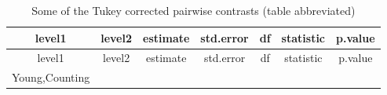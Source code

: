 \documentclass[]{article}
\begin{document}
\begin{longtable}[]{@{}ccccccc@{}}
\caption{Some of the Tukey corrected pairwise contrasts (table abbreviated)}\tabularnewline
\toprule
\begin{minipage}[b]{0.16\columnwidth}\centering
level1\strut
\end{minipage} & \begin{minipage}[b]{0.16\columnwidth}\centering
level2\strut
\end{minipage} & \begin{minipage}[b]{0.10\columnwidth}\centering
estimate\strut
\end{minipage} & \begin{minipage}[b]{0.11\columnwidth}\centering
std.error\strut
\end{minipage} & \begin{minipage}[b]{0.05\columnwidth}\centering
df\strut
\end{minipage} & \begin{minipage}[b]{0.11\columnwidth}\centering
statistic\strut
\end{minipage} & \begin{minipage}[b]{0.11\columnwidth}\centering
p.value\strut
\end{minipage}\tabularnewline
\midrule
\endfirsthead
\toprule
\begin{minipage}[b]{0.16\columnwidth}\centering
level1\strut
\end{minipage} & \begin{minipage}[b]{0.16\columnwidth}\centering
level2\strut
\end{minipage} & \begin{minipage}[b]{0.10\columnwidth}\centering
estimate\strut
\end{minipage} & \begin{minipage}[b]{0.11\columnwidth}\centering
std.error\strut
\end{minipage} & \begin{minipage}[b]{0.05\columnwidth}\centering
df\strut
\end{minipage} & \begin{minipage}[b]{0.11\columnwidth}\centering
statistic\strut
\end{minipage} & \begin{minipage}[b]{0.11\columnwidth}\centering
p.value\strut
\end{minipage}\tabularnewline
\midrule
\endhead
\begin{minipage}[t]{0.16\columnwidth}\centering
Young,Counting\strut
\end{minipage} & \begin{minipage}[t]{0.16\columnwidth}\centering

\end{minipage}
\end{longtable}
\end{document}
